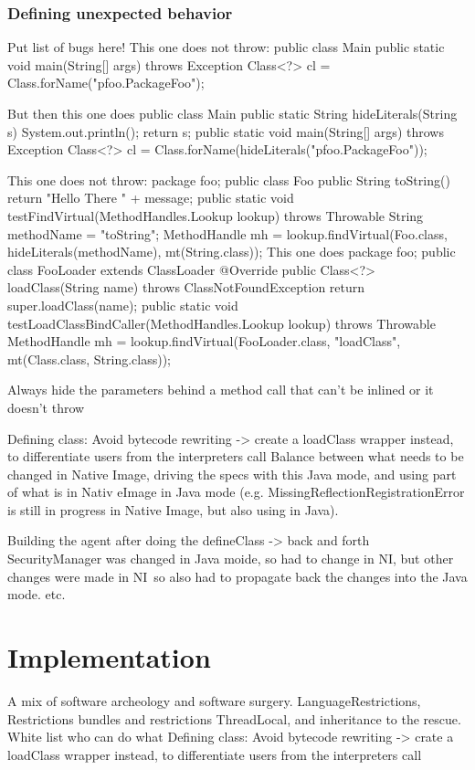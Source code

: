 \subsection{Defining unexpected behavior}
Put list of bugs here!
This one does not throw:
public class Main {
    public static void main(String[] args) throws Exception {
        Class<?> cl = Class.forName("pfoo.PackageFoo");
    }
}

But then this one does
public class Main {
    public static String hideLiterals(String s) {
        System.out.println();
        return s;
    }
    public static void main(String[] args) throws Exception {
        Class<?> cl = Class.forName(hideLiterals("pfoo.PackageFoo"));
    }
}

This one does not throw:
package foo;
public class Foo {
    public String toString() {
        return "Hello There " + message;
    }
}
public static void testFindVirtual(MethodHandles.Lookup lookup) throws Throwable {
    String methodName = "toString";
    MethodHandle mh = lookup.findVirtual(Foo.class, hideLiterals(methodName), mt(String.class));
}
This one does
package foo;
public class FooLoader extends ClassLoader {
    @Override
    public Class<?> loadClass(String name) throws ClassNotFoundException {
        return super.loadClass(name);
    }
}
public static void testLoadClassBindCaller(MethodHandles.Lookup lookup) throws Throwable {
    MethodHandle mh = lookup.findVirtual(FooLoader.class, "loadClass", mt(Class.class, String.class));
}

Always hide the parameters behind a method call that can't be inlined or it doesn't throw


Defining class: Avoid bytecode rewriting -> create a loadClass wrapper instead, to differentiate users from the interpreters call
Balance between what needs to be changed in Native Image, driving the specs with this Java mode, and using part of what is in Nativ eImage in Java mode (e.g. 
MissingReflectionRegistrationError is still in progress in Native Image, but also using in Java).

Building the agent after doing the defineClass -> back and forth
SecurityManager was changed in Java moide, so had to change in NI, but other changes were made in NI so also had to propagate back the changes into the Java mode.
etc.


\chapter{Implementation}
A mix of software archeology and software surgery.
LanguageRestrictions, Restrictions bundles and restrictions
ThreadLocal, and inheritance to the rescue. White list who can do what
Defining class: Avoid bytecode rewriting -> crate a loadClass wrapper instead, to differentiate users from the interpreters call

